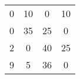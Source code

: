     \begin{tabular}{cccc}
    \rowcolor[rgb]{ .749,  .749,  .749} 0       & 10      & \cellcolor[rgb]{ .929,  .49,  .192} 0 & 10 \\
    \rowcolor[rgb]{ .929,  .49,  .192} 0       & \cellcolor[rgb]{ .749,  .749,  .749} 35 & \cellcolor[rgb]{ .749,  .749,  .749} 25 & \cellcolor[rgb]{ .749,  .749,  .749} 0 \\
    \rowcolor[rgb]{ .749,  .749,  .749} 2       & \cellcolor[rgb]{ .929,  .49,  .192} 0 & 40      & 25 \\
    9       & 5       & 36      & \cellcolor[rgb]{ .929,  .49,  .192} 0 \bigstrut[b]\\
    \hline
    \hline
    \end{tabular}%
